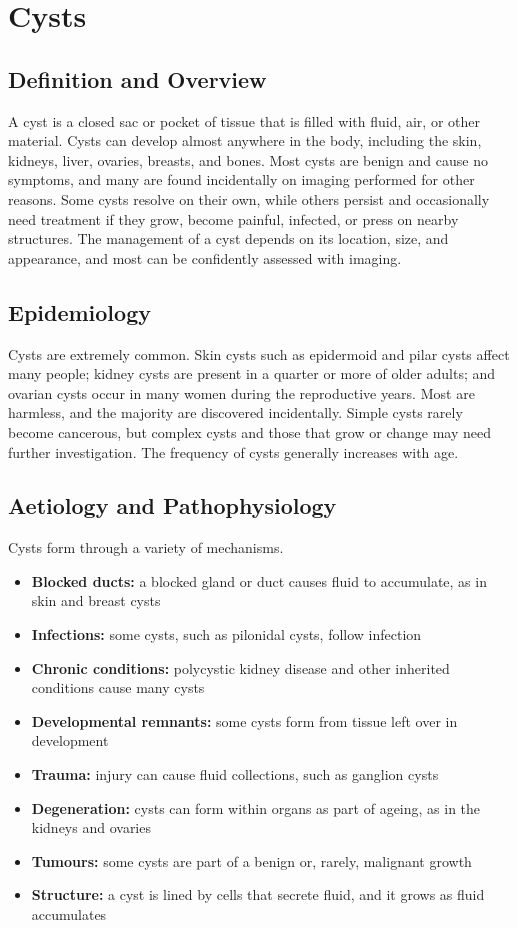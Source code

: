\chapter{Cysts}

\section*{Definition and Overview}
A cyst is a closed sac or pocket of tissue that is filled with fluid, air, or other material. Cysts can develop almost anywhere in the body, including the skin, kidneys, liver, ovaries, breasts, and bones. Most cysts are benign and cause no symptoms, and many are found incidentally on imaging performed for other reasons. Some cysts resolve on their own, while others persist and occasionally need treatment if they grow, become painful, infected, or press on nearby structures. The management of a cyst depends on its location, size, and appearance, and most can be confidently assessed with imaging.

\section*{Epidemiology}
Cysts are extremely common. Skin cysts such as epidermoid and pilar cysts affect many people; kidney cysts are present in a quarter or more of older adults; and ovarian cysts occur in many women during the reproductive years. Most are harmless, and the majority are discovered incidentally. Simple cysts rarely become cancerous, but complex cysts and those that grow or change may need further investigation. The frequency of cysts generally increases with age.

\section*{Aetiology and Pathophysiology}
Cysts form through a variety of mechanisms.

\begin{itemize}
    \item \textbf{Blocked ducts:} a blocked gland or duct causes fluid to accumulate, as in skin and breast cysts
    \item \textbf{Infections:} some cysts, such as pilonidal cysts, follow infection
    \item \textbf{Chronic conditions:} polycystic kidney disease and other inherited conditions cause many cysts
    \item \textbf{Developmental remnants:} some cysts form from tissue left over in development
    \item \textbf{Trauma:} injury can cause fluid collections, such as ganglion cysts
    \item \textbf{Degeneration:} cysts can form within organs as part of ageing, as in the kidneys and ovaries
    \item \textbf{Tumours:} some cysts are part of a benign or, rarely, malignant growth
    \item \textbf{Structure:} a cyst is lined by cells that secrete fluid, and it grows as fluid accumulates
\end{itemize}

